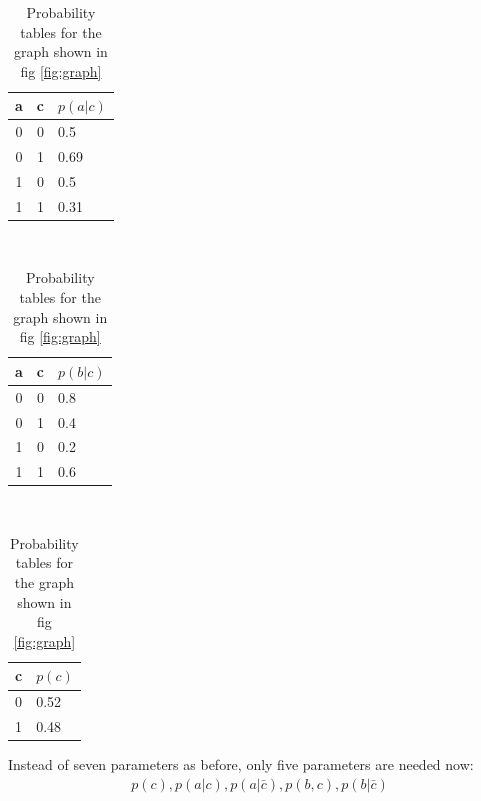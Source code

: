 \documentclass[a4paper,11pt]{article}
\theoremstyle{definition}
\theoremstyle{plain}
\theoremstyle{remark}
\begin{document}
\begin{table}[H]
\centering
\caption{Probability tables for the graph shown in fig \ref{fig:graph}}
\begin{tabular}{|c|c|l|}
\hline
a & c & $p(a|c)$ \\ \hline
0 & 0 & 0.5 \\ \hline
0 & 1 & 0.69 \\ \hline
1 & 0 & 0.5 \\ \hline
1 & 1 & 0.31 \\ \hline
\end{tabular}
~
\begin{tabular}{|c|c|l|}
\hline
a & c & $p(b|c)$ \\ \hline
0 & 0 & 0.8 \\ \hline
0 & 1 & 0.4 \\ \hline
1 & 0 & 0.2 \\ \hline
1 & 1 & 0.6 \\ \hline
\end{tabular}
~
\begin{tabular}{|c|l|}
\hline
c & $p(c)$ \\ \hline
0 & 0.52 \\ \hline
1 & 0.48 \\ \hline
\end{tabular}
\end{table}
Instead of seven parameters as before, only five parameters are needed now:
\begin{align}
p(c), p(a|c), p(a|\bar{c}), p(b,c), p(b|\bar{c})
\end{align}
\end{document}
